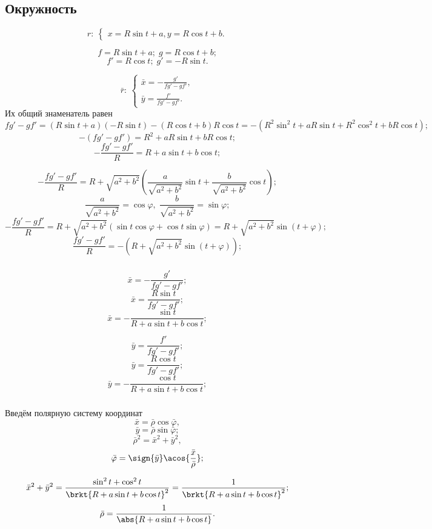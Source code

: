 \subsection{Окружность}
$$r: \: 
\left\{ \begin{gathered}
	x = R\sin{t}+a,
	y = R\cos{t}+b.
\end{gathered} \right.
$$

$$f = R\sin{t}+a; \; g = R\cos{t}+b;$$
$$f' = R\cos{t}; \; g' = -R\sin{t}.$$

$$\bar{r}:
\:
\left\{
\begin{gathered}
	\bar{x} =  -\frac{g'}{f g' - g f'},\\
	\bar{y} =  \frac{f'}{f g' - g f'}.
\end{gathered}
\right.
$$
Их общий знаменатель равен
$$f g' - g f' = (R\sin{t}+a)(-R\sin{t}) - (R\cos{t}+b) R\cos{t} = -\left(R^2\sin^2{t}+aR\sin{t} + R^2\cos^2{t} +bR\cos{t}\right);$$
$$-(f g' - g f') = R^2 + aR\sin{t} + bR\cos{t};$$
$$-\frac{f g' - g f'}{R} = R + a\sin{t} + b\cos{t};$$

$$-\frac{f g' - g f'}{R} = R + \sqrt{a^2+b^2}\left(\frac{a}{\sqrt{a^2+b^2}}\sin{t} + \frac{b}{\sqrt{a^2+b^2}}\cos{t}\right);$$
$$\frac{a}{\sqrt{a^2+b^2}} =\cos\varphi, \; \frac{b}{\sqrt{a^2+b^2}} = \sin\varphi;$$
$$-\frac{f g' - g f'}{R} = R + \sqrt{a^2+b^2}\left(\sin{t}\cos\varphi + \cos{t}\sin\varphi\right) = R + \sqrt{a^2+b^2}\sin{\left(t + \varphi \right)};$$
$$\frac{f g' - g f'}{R} = - \left( R + \sqrt{a^2+b^2}\sin{\left(t + \varphi \right)} \right);$$


\subparagraph{}
\begin{minipage}{0.4\textwidth}
$$\bar{x} =  -\frac{g'}{f g' - g f'};$$
$$\bar{x} =  \frac{R \sin{t}}{f g' - g f'};$$
$$\bar{x} =  -\frac{\sin{t}}{R + a\sin{t} + b\cos{t}};$$

\end{minipage}
\begin{minipage}{0.4\textwidth}
$$\bar{y} =  \frac{f'}{f g' - g f'};$$
$$\bar{y} =  \frac{R \cos{t}}{f g' - g f'};$$
$$\bar{y} =  -\frac{\cos{t}}{R + a\sin{t} + b\cos{t}};$$

\end{minipage}

\subparagraph{} Введём полярную систему координат
$$\bar{x} = \bar{\rho}\cos{\bar{\varphi}},$$
$$\bar{y} = \bar{\rho}\sin{\bar{\varphi}};$$
$$\bar{\rho}^2 = \bar{x}^2 + \bar{y}^2,$$
$$\bar{\varphi} = \sign{\bar{y}}\acos{\frac{\bar{x}}{\bar{\rho}}};$$

$$\bar{x}^2 + \bar{y}^2 
= \frac{\sin^2{t} + \cos^2{t}}{\brkt{R + a\sin{t} + b\cos{t}}^2}
= \frac{1}{\brkt{R + a\sin{t} + b\cos{t}}^2};$$
$$\bar{\rho} = \frac{1}{\abs{R + a\sin{t} + b\cos{t}}}.$$

